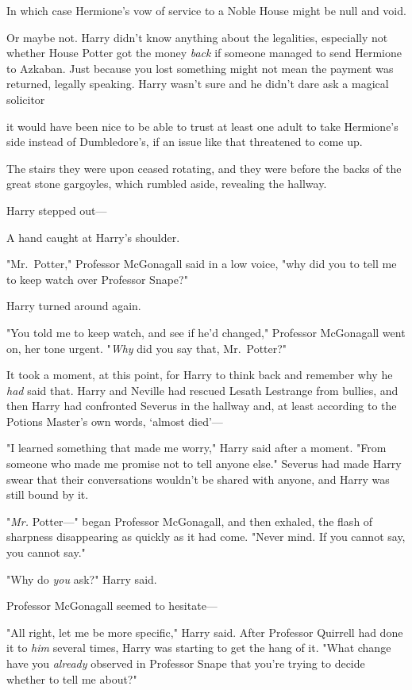 In which case Hermione's vow of service to a Noble House might be null and void.

Or maybe not. Harry didn't know anything about the legalities, especially not
whether House Potter got the money \emph{back} if someone managed to send
Hermione to Azkaban. Just because you lost something might not mean the payment
was returned, legally speaking. Harry wasn't sure and he didn't dare ask a
magical solicitor{\el}

{\el} it would have been nice to be able to trust at least one adult to take
Hermione's side instead of Dumbledore's, if an issue like that threatened to
come up.

The stairs they were upon ceased rotating, and they were before the backs of
the great stone gargoyles, which rumbled aside, revealing the hallway.

Harry stepped out---

A hand caught at Harry's shoulder.

"Mr.~Potter," Professor McGonagall said in a low voice, "why did you to tell me
to keep watch over Professor Snape?"

Harry turned around again.

"You told me to keep watch, and see if he'd changed," Professor McGonagall went
on, her tone urgent. "\emph{Why} did you say that, Mr.~Potter?"

It took a moment, at this point, for Harry to think back and remember why he
\emph{had} said that. Harry and Neville had rescued Lesath Lestrange from
bullies, and then Harry had confronted Severus in the hallway and, at least
according to the Potions Master's own words, `almost died'---

"I learned something that made me worry," Harry said after a moment. "From
someone who made me promise not to tell anyone else." Severus had made Harry
swear that their conversations wouldn't be shared with anyone, and Harry was
still bound by it.

"\emph{Mr.} Potter\mbox{---}" began Professor McGonagall, and then exhaled, the flash
of sharpness disappearing as quickly as it had come. "Never mind. If you cannot
say, you cannot say."

"Why do \emph{you} ask?" Harry said.

Professor McGonagall seemed to hesitate---

"All right, let me be more specific," Harry said. After Professor Quirrell had
done it to \emph{him} several times, Harry was starting to get the hang of it.
"What change have you \emph{already} observed in Professor Snape that you're
trying to decide whether to tell me about?"

